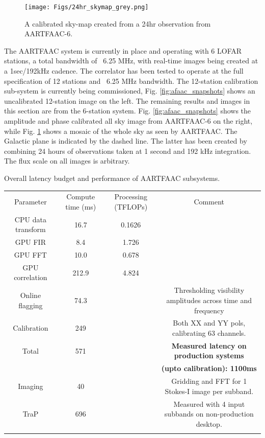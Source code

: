 \documentclass{ws-jai}
\begin{document}
\begin{figure}
  \texttt{[image: Figs/24hr\_skymap\_grey.png]}
  \caption{A calibrated sky-map created from a 24hr observation from AARTFAAC-6.}
  \label{fig:afaac_24hr}
  
\end{figure}
The AARTFAAC system is currently in place and operating with 6 LOFAR stations, a
total  bandwidth  of  ~6.25  MHz,  with real-time  images  being  created  at  a
1sec/192kHz  cadence. The  correlator has  been tested  to operate  at the  full
specification of 12 stations and ~6.25 MHz bandwidth. The 12-station calibration
sub-system is currently being commissioned, Fig. \ref{fig:afaac_snapshots} shows
an uncalibrated 12-station image on the  left.  The remaining results and images
in this section are from  the 6-station system.  Fig.  \ref{fig:afaac_snapshots}
shows the  amplitude and phase calibrated  all sky image from  AARTFAAC-6 on the
right, while Fig.  \ref{fig:afaac_24hr} shows a  mosaic of the whole sky as seen
by AARTFAAC. The Galactic plane is indicated  by the dashed line. The latter has
been created by combining 24 hours of observations taken at 1 second and 192 kHz
integration.  The flux scale on all images is arbitrary. \\

\begin{wstable}[h]
\caption{Overall latency budget and performance of AARTFAAC subsystems.}
\begin{tabular}{@{}cccc@{}} \toprule
Parameter & Compute time (ms) & Processing (TFLOPs) & Comment \\ \colrule
CPU data transform & 16.7 & 0.1626  \\
GPU FIR & 8.4 & 1.726\\
GPU FFT & 10.0 & 0.678  \\
GPU correlation & 212.9 & 4.824  \\
Online flagging & 74.3 &  & Thresholding visibility amplitudes across time and frequency\\
Calibration & 249 & & Both XX and YY pols, calibrating 63 channels.\\
 \colrule
Total & 571 & & \textbf{Measured latency on production systems} \\
 & & & \textbf {(upto calibration): 1100ms} \\ \colrule

Imaging & 40 &  & Gridding and FFT for 1 Stokes-I image per subband.\\ 
TraP & 696 &  & Measured with 4 input subbands on non-production desktop.\\ \colrule
\end{tabular}
\label{tab:afaac_latency}
\end{wstable}
\end{document}
